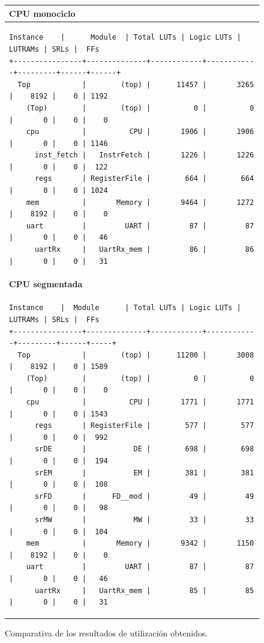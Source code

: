 \vspace{+0.1cm}
\begin{figure}[H]
\centering
\renewcommand{\arraystretch}{1}
\begin{tabular}{|p{}|}
\hline
\textbf{CPU monociclo} \\
\hline
\begin{lstlisting}[style=RiscVStyleSmaller]
     Instance    |      Module  | Total LUTs | Logic LUTs | LUTRAMs | SRLs |  FFs
+----------------+--------------+------------+------------+---------+------+------+
  Top            |        (top) |      11457 |       3265 |    8192 |    0 | 1192
    (Top)        |        (top) |          0 |          0 |       0 |    0 |    0
    cpu          |          CPU |       1906 |       1906 |       0 |    0 | 1146
      inst_fetch |   InstrFetch |       1226 |       1226 |       0 |    0 |  122
      regs       | RegisterFile |        664 |        664 |       0 |    0 | 1024
    mem          |       Memory |       9464 |       1272 |    8192 |    0 |    0
    uart         |         UART |         87 |         87 |       0 |    0 |   46
      uartRx     |   UartRx_mem |         86 |         86 |       0 |    0 |   31
\end{lstlisting}
\\
\hline
\textbf{CPU segmentada} \\
\hline
\begin{lstlisting}[style=RiscVStyleSmaller]
     Instance    |  Module      | Total LUTs | Logic LUTs | LUTRAMs | SRLs |  FFs
+----------------+--------------+------------+------------+---------+------+-----+
  Top            |        (top) |      11200 |       3008 |    8192 |    0 | 1589
    (Top)        |        (top) |          0 |          0 |       0 |    0 |    0
    cpu          |          CPU |       1771 |       1771 |       0 |    0 | 1543
      regs       | RegisterFile |        577 |        577 |       0 |    0 |  992
      srDE       |           DE |        698 |        698 |       0 |    0 |  194
      srEM       |           EM |        381 |        381 |       0 |    0 |  108
      srFD       |      FD__mod |         49 |         49 |       0 |    0 |   98
      srMW       |           MW |         33 |         33 |       0 |    0 |  104
    mem          |       Memory |       9342 |       1150 |    8192 |    0 |    0
    uart         |         UART |         87 |         87 |       0 |    0 |   46
      uartRx     |   UartRx_mem |         85 |         85 |       0 |    0 |   31
\end{lstlisting}
\\
\hline
\end{tabular}
\caption{Comparativa de los resultados de utilización obtenidos.}
\end{figure}


